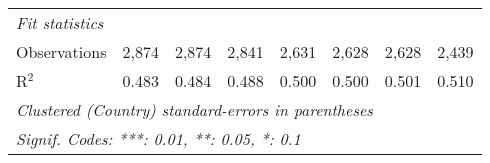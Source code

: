 \begin{tabular}{lccccccc}
   \midrule \emph{Fit statistics}\\
   Observations                                                        & 2,874         & 2,874         & 2,841         & 2,631         & 2,628         & 2,628         & 2,439\\  
   R$^2$                                                               & 0.483         & 0.484         & 0.488         & 0.500         & 0.500         & 0.501         & 0.510\\  
   \midrule
   \multicolumn{8}{l}{\emph{Clustered (Country) standard-errors in parentheses}}\\
   \multicolumn{8}{l}{\emph{Signif. Codes: ***: 0.01, **: 0.05, *: 0.1}}\\
\end{tabular}
\par\endgroup


